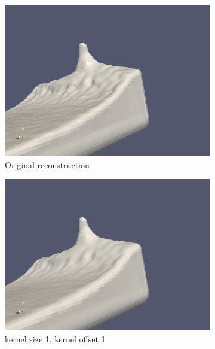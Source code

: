 \begin{figure}
        \begin{subfigure}[b]{0.5\textwidth}
               \includegraphics[width=\textwidth]{figures/DBBlur_ks-0_ko-0.png}
               \caption{Original reconstruction}
               \label{fig:kskdOrig}
        \end{subfigure}
        \begin{subfigure}[b]{0.5\textwidth}
               \includegraphics[width=\textwidth]{figures/DBBlur_ks-1_ko-1.png}
               \caption{kernel size 1, kernel offset 1}
               \label{fig:ks1ko1}
        \end{subfigure}
        \begin{subfigure}[b]{0.5\textwidth}

\end{subfigure}
\end{figure}
